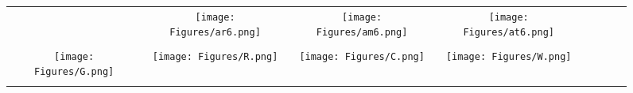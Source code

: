 \documentclass[journal]{IEEEtran}
\begin{document}
\begin{figure*}[!t]
\begin{tabular}{cccccccc}
		&
		\hspace{0.4cm}
		\begin{minipage}{30pt}
			\texttt{[image: Figures/ar6.png]}
			\centering{(f)}
		\end{minipage}
		&
		\hspace{0.4cm}
		\begin{minipage}{30pt}
			\texttt{[image: Figures/am6.png]}
			\centering{(g)}
		\end{minipage}
		&
		\hspace{0.4cm}
		\begin{minipage}{30pt}
			\texttt{[image: Figures/at6.png]}
			\centering{(h)}
		\end{minipage}
		\\
		\\
			\begin{minipage}{30pt}
			\texttt{[image: Figures/G.png]}
\end{minipage}
		&
		\hspace{0.4cm}
		\begin{minipage}{30pt}
			\texttt{[image: Figures/R.png]}
\end{minipage}
		&
		\hspace{0.4cm}
		\begin{minipage}{30pt}
			\texttt{[image: Figures/C.png]}
\end{minipage}
		&
		\hspace{0.4cm}
		\begin{minipage}{30pt}
			\texttt{[image: Figures/W.png]}
\end{minipage}
		&
		\hspace{0.4cm}
		\begin{minipage}{30pt}
\end{minipage}
		&
		\hspace{0.4cm}
		\begin{minipage}{30pt}
\end{minipage}
		&
		\hspace{0.4cm}
		\begin{minipage}{30pt}
\end{minipage}
		&
	
		\hspace{0.4cm}
		\begin{minipage}{30pt}
\end{minipage}
		\\
		\\


\end{tabular}
\end{figure*}
\end{document}
